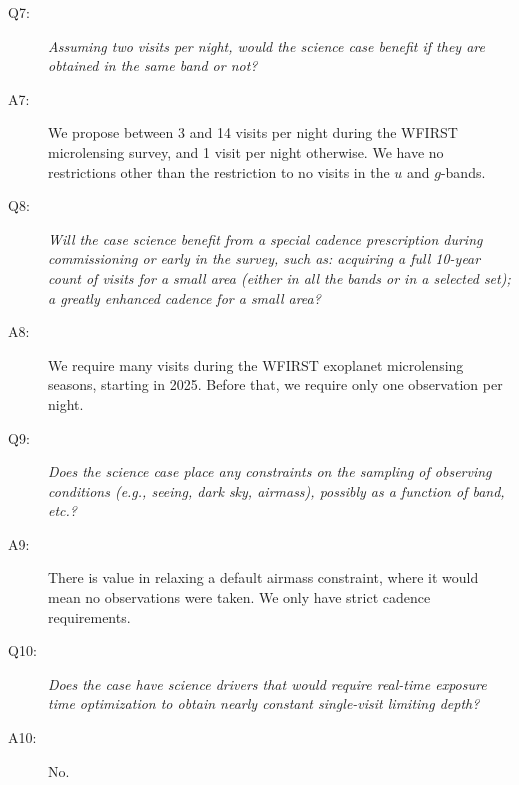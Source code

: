 \begin{description}
\item[Q7:] {\it Assuming two visits per night, would the science case
benefit if they are obtained in the same band or not?}

\item[A7:] We propose between 3 and 14 visits per night during the
WFIRST microlensing survey, and 1 visit per night otherwise. We have no
restrictions other than the restriction to no visits in the $u$ and
$g$-bands.

\item[Q8:] {\it Will the case science benefit from a special cadence
prescription during commissioning or early in the survey, such as:
acquiring a full 10-year count of visits for a small area (either in all
the bands or in a  selected set); a greatly enhanced cadence for a small
area?}

\item[A8:] We require many visits during the WFIRST exoplanet
microlensing seasons, starting in 2025. Before that, we require only one
observation per night.

\item[Q9:] {\it Does the science case place any constraints on the
sampling of observing conditions (e.g., seeing, dark sky, airmass),
possibly as a function of band, etc.?}

\item[A9:] There is value in relaxing a default airmass constraint,
where it would mean no observations were taken. We only have strict
cadence requirements.

\item[Q10:] {\it Does the case have science drivers that would require
real-time exposure time optimization to obtain nearly constant
single-visit limiting depth?}

\item[A10:] No.

\end{description}



\navigationbar
